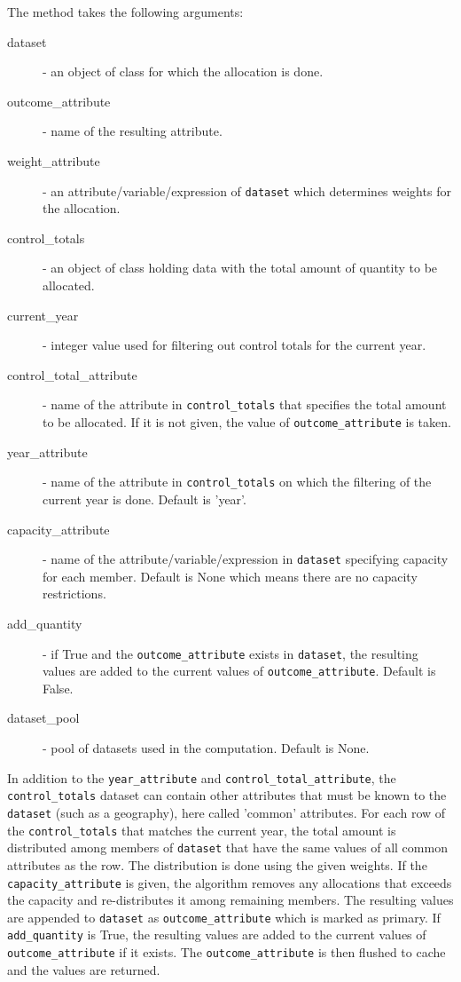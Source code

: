The  method takes the following arguments:
\begin{description}
\item[dataset] - an object of class  for which the allocation is done.
\item[outcome_attribute] - name of the resulting attribute.
\item[weight_attribute] - an attribute/variable/expression of \verb|dataset| which determines weights for the allocation.
\item[control_totals] - an object of class  holding data with the total amount of quantity to be allocated.
\item[current_year] - integer value used for filtering out control totals for the current year. 
\item[control_total_attribute] - name of the attribute in \verb|control_totals| that specifies the total amount to be allocated.
  If it is not given, the value of \verb|outcome_attribute| is taken.
\item[year_attribute] - name of the attribute in \verb|control_totals| on which the filtering 
of the current year is done. Default is 'year'.
\item[capacity_attribute] - name of the attribute/variable/expression in \verb|dataset| specifying capacity for each member. 
  Default is None which means there are no capacity restrictions. 
\item[add_quantity] - if True and the \verb|outcome_attribute| exists in \verb|dataset|, 
  the resulting values are added to the current values of 
    \verb|outcome_attribute|. Default is False.
\item[dataset_pool] - pool of datasets used in the computation. Default is None.
\end{description}

In addition to the \verb|year_attribute| and \verb|control_total_attribute|, the \verb|control_totals| dataset 
can contain other attributes that must be known to the \verb|dataset| (such as a geography), here called 'common' attributes.
For each row of the \verb|control_totals| that matches the current year,
the total amount is distributed among members of \verb|dataset| that have the same values of all common attributes as the row.
The distribution is done using the given weights. 
If the \verb|capacity_attribute| is given, the algorithm removes any allocations that exceeds the capacity and 
re-distributes it among remaining members. The resulting values are appended 
to \verb|dataset| as 
\verb|outcome_attribute| which is marked as primary.
If \verb|add_quantity| is True, the resulting values are added to the current values of 
        \verb|outcome_attribute| if it exists. 
The \verb|outcome_attribute| is then flushed to cache and the values are returned.
        
